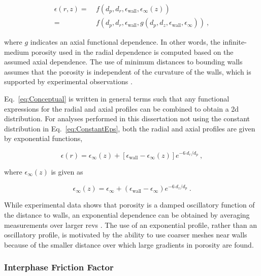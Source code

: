 \begin{equation}
\begin{aligned}
\label{eq:Conceptual}
\epsilon(r,z)=&\ f\left(d_p, d_r, \epsilon_\text{wall}, \epsilon_\infty(z)\right)\\
=&\ f\left(d_p, d_r, \epsilon_\text{wall}, g\left(d_p, d_z, \epsilon_\text{wall}, \epsilon_\infty\right)\right)\ ,
\end{aligned}
\end{equation}

\noindent where \(g\) indicates an axial functional dependence. In other words, the infinite-medium porosity used in the radial dependence is computed based on the assumed axial dependence. The use of minimum distances to bounding walls assumes that the porosity is independent of the curvature of the walls, which is supported by experimental observations \cite{duToit2008,benenati}. 

Eq.\ \eqref{eq:Conceptual} is written in general terms such that any functional expressions for the radial and axial profiles can be combined to obtain a \gls{2d} distribution. For analyses performed in this dissertation not using the constant distribution in Eq.\ \eqref{eq:ConstantEps}, both the radial and axial profiles are given by exponential functions,

\begin{equation}
\label{eq:ExpPorosity2}
\epsilon(r)=\epsilon_\infty(z)+\left\lbrack\epsilon_\text{wall}-\epsilon_\infty(z)\right\rbrack e^{-6\ d_r/d_p}\ ,
\end{equation}

\noindent where \(\epsilon_\infty(z)\) is given as

\begin{equation}
\epsilon_\infty(z)=\epsilon_\infty+\left(\epsilon_\text{wall}-\epsilon_\infty\right)e^{-6\ d_z/d_p}\ .
\end{equation}

\noindent While experimental data shows that porosity is a damped oscillatory function of the distance to walls, an exponential dependence can be obtained by averaging measurements over larger \glspl{rev} \cite{duToit2008,keil,vortmeyer}. The use of an exponential profile, rather than an oscillatory profile, is motivated by the ability to use coarser meshes near walls because of the smaller distance over which large gradients in porosity are found.

\subsubsection{Interphase Friction Factor}
\label{sec:W}

